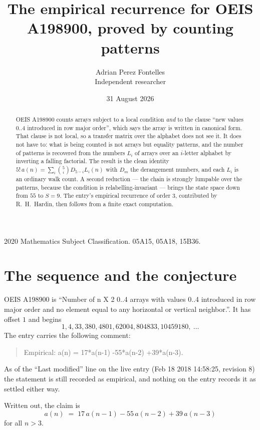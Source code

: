 \documentclass[11pt,a4paper]{article}
\title{The empirical recurrence for OEIS A198900, proved by counting patterns}
\author{Adrian Perez Fontelles\\ \small Independent researcher}
\date{31 August 2026}
\theoremstyle{plain}
\theoremstyle{definition}
\begin{document}
\maketitle

\begin{abstract}
OEIS A198900 counts arrays subject to a local condition \emph{and} to the clause ``new values
$0..4$ introduced in row major order'', which says the array is written in canonical
form. That clause is not local, so a transfer matrix over the alphabet does not see it. It
does not have to: what is being counted is not arrays but equality patterns, and the number
of patterns is recovered from the numbers $L_i$ of arrays over an $i$-letter alphabet by
inverting a falling factorial. The result is the clean identity
$5!\,a(n)=\sum_i\binom{5}{i}D_{5-i}L_i(n)$ with $D_m$ the derangement numbers,
and each $L_i$ is an ordinary walk count. A second reduction --- the chain is strongly
lumpable over the patterns, because the condition is relabelling-invariant --- brings the
state space down from $55$ to $S=9$. The entry's empirical recurrence of order
$3$, contributed by R.~H.~Hardin, then follows from a finite exact computation.
\end{abstract}

\noindent\small 2020 Mathematics Subject Classification. 05A15, 05A18, 15B36.\normalsize

\section{The sequence and the conjecture}

OEIS A198900 is ``Number of n X 2 0..4 arrays with values 0..4 introduced in row major order and no element equal to any horizontal or vertical neighbor.''. It has offset $1$ and begins
\[
1, 4, 33, 380, 4801, 62004, 804833, 10459180,\ \dots
\]
The entry carries the following comment:
\begin{quote}\small
Empirical: a(n) = 17*a(n-1) -55*a(n-2) +39*a(n-3).
\end{quote}
As of the ``Last modified'' line on the live entry (Feb 18 2018 14:58:25, revision 8) the statement is
still recorded as empirical, and nothing on the entry records it as settled either way.

Written out, the claim is
\begin{equation}\label{eq:conj}
a(n)\;=\;17\,a(n-1) - 55\,a(n-2) + 39\,a(n-3)
\end{equation}
for all $n>3$.
\end{document}
